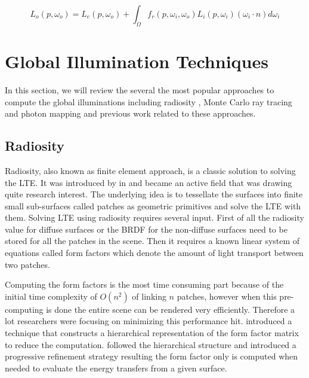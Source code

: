 \begin{equation}
L_{o}(p, \omega_{o}) = L_{e}(p, \omega_{o}) + \int_{\Omega}f_{r}(p, \omega_{i}, \omega_{o})L_{i}(p, \omega_{i})(\omega_{i} \cdot n)d\omega_{i}
\label{eq:lte}
\end{equation}  


\section{Global Illumination Techniques}
In this section, we will review the several the most popular approaches to compute the global illuminations including radiosity , Monte Carlo ray tracing and photon mapping and previous work related to these approaches. 

\subsection{Radiosity}

Radiosity, also known as finite element approach, is a classic solution to solving the LTE. It was introduced by  \citeauthor{Goral:1984:MIL:964965.808601} in \citep{Goral:1984:MIL:964965.808601} and became an active field that was drawing quite research interest. The underlying idea is to tessellate the surfaces into finite small sub-surfaces called patches as geometric primitives and solve the LTE with them. Solving LTE using radiosity requires several input. First of all the radiosity value for diffuse surfaces or the BRDF for the non-diffuse surfaces need to be stored for all the patches in the scene. Then it requires a known linear system of equations called form factors which denote the amount of light transport between two patches. 

Computing the form factors is the most time consuming part because of the initial time complexity of \(O(n^{2})\) of linking \(n\) patches, however when this pre-computing is done the entire scene can be rendered very efficiently. Therefore a lot researchers were focusing on minimizing this performance hit. \citeauthor{Hanrahan:1991:RHR:127719.122740}\cite{Hanrahan:1991:RHR:127719.122740} introduced a technique that constructs a hierarchical representation of the form factor matrix to reduce the computation. \citeauthor{Holzschuch94anefficient}\cite{Holzschuch94anefficient} followed the hierarchical structure and introduced a progressive refinement strategy resulting the form factor only is computed when needed to evaluate the energy transfers from a given surface. 


